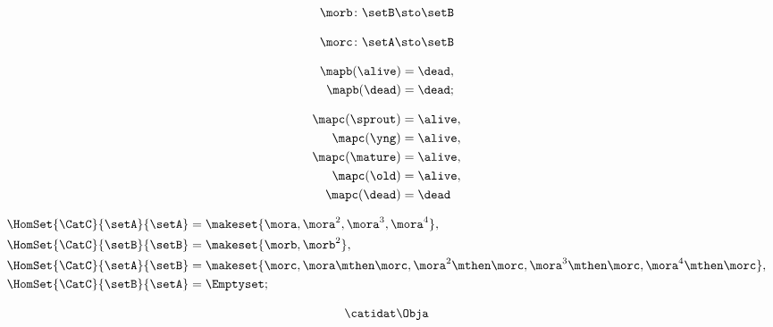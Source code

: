 \begin{forslides}
    \begin{equation}
        \label{eq:semicats-slides-82a}
        \morb \colon \setB \sto \setB
    \end{equation}
    
    \begin{equation}
        \label{eq:semicats-slides-82b}
        \morc \colon \setA \sto \setB
    \end{equation}

    \begin{equation}
        \label{eq:semicats-slides-83}
        \begin{aligned}
            \mapb(\alive) & =  \dead, \\
            \mapb(\dead)  & =  \dead;
        \end{aligned}
    \end{equation}

    \begin{equation}
        \label{eq:semicats-slides-84}
        \begin{aligned}
            \mapc(\sprout) & = \alive, \\
            \mapc(\yng)    & =  \alive, \\
            \mapc(\mature) & = \alive , \\
            \mapc( \old)   & = \alive, \\
            \mapc (\dead)  & = \dead
        \end{aligned}
    \end{equation}

    \begin{equation}
        \label{eq:semicats-slides-85}
        \begin{aligned}
            \HomSet{\CatC}{\setA}{\setA} & = \makeset{ \mora, \mora^2, \mora^3, \mora^4 }, \\
            \HomSet{\CatC}{\setB}{\setB} & =  \makeset{ \morb, \morb^2 }, \\
            \HomSet{\CatC}{\setA}{\setB} & =  \makeset{ \morc, \mora \mthen \morc, \mora^2 \mthen \morc, \mora^3 \mthen \morc, \mora^4 \mthen \morc}, \\
            \HomSet{\CatC}{\setB}{\setA} & = \Emptyset;
        \end{aligned}
    \end{equation}

    \begin{equation}
        \label{eq:semicats-slides-86}
        \catidat\Obja
    \end{equation}


\end{forslides}
